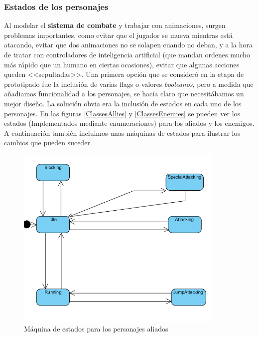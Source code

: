 \subsubsection{Estados de los personajes}

Al modelar el \textbf{sistema de combate} y trabajar con animaciones, surgen problemas importantes, como evitar que el jugador se mueva mientras está atacando, evitar que dos animaciones no se solapen cuando no deban, y a la hora de tratar con controladores de inteligencia artificial (que mandan ordenes mucho más rápido que un humano en ciertas ocasiones), evitar que algunas acciones queden <<sepultadas>>. Una primera opción que se consideró en la etapa de prototipado fue la inclusión de varias flags o valores \textit{booleanos}, pero a medida que añadiamos funcionalidad a los personajes, se hacía claro que necesitábamos un mejor diseño. La solución obvia era la inclusión de estados en cada uno de los personajes. En las figuras \ref{ClassesAllies} y \ref{ClassesEnemies} se pueden ver los estados (Implementados mediante enumeraciones) para los aliados y los enemigos. A continuación también incluimos unas máquinas de estados para ilustrar los cambios que pueden suceder.


\begin{figure}[H]
  \centering
  \includegraphics[width=10cm]{./images/SM_Ally.png}
  \caption{Máquina de estados para los personajes aliados}
  \label{AllySM}
\end{figure}

